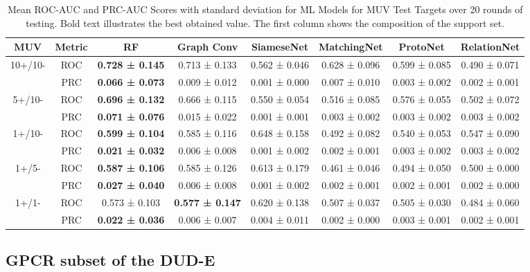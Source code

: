 \documentclass[journal=acscii,manuscript=article]{achemso}
\begin{document}
\begin{table}
\caption{Mean ROC-AUC and PRC-AUC Scores with standard deviation for ML Models for MUV Test Targets over 20 rounds of testing. Bold text illustrates the best obtained value. The first column shows the composition of the support set.}
\centering
\begin{tabular}{@{}cccccccc@{}}
\hline
\textbf{MUV} & \textbf{Metric} & \textbf{RF} & \textbf{Graph Conv} & \textbf{SiameseNet} & \textbf{MatchingNet} & \textbf{ProtoNet} & \textbf{RelationNet} \\
\hline
10+/10- & ROC & \textbf{0.728 ± 0.145} & 0.713 ± 0.133 & 0.562 ± 0.046 & 0.628 ± 0.096 & 0.599 ± 0.085 & 0.490 ± 0.071 \\ & PRC & \textbf{0.066 ± 0.073} & 0.009 ± 0.012 & 0.001 ± 0.000 & 0.007 ± 0.010 & 0.003 ± 0.002 & 0.002 ± 0.001\\
\hline
5+/10- & ROC & \textbf{0.696 ± 0.132} & 0.666 ± 0.115 & 0.550 ± 0.054 & 0.516 ± 0.085 & 0.576 ± 0.055 & 0.502 ± 0.072 \\ & PRC & \textbf{0.071 ± 0.076} & 0.015 ± 0.022 & 0.001 ± 0.001 & 0.003 ± 0.002 & 0.003 ± 0.002 & 0.003 ± 0.002\\
\hline
1+/10- & ROC & \textbf{0.599 ± 0.104} & 0.585 ± 0.116 & 0.648 ± 0.158 & 0.492 ± 0.082 & 0.540 ± 0.053 & 0.547 ± 0.090 \\ & PRC & \textbf{0.021 ± 0.032} & 0.006 ± 0.008 & 0.001 ± 0.002 & 0.002 ± 0.001 & 0.003 ± 0.002 & 0.003 ± 0.002\\
\hline
1+/5- & ROC & \textbf{0.587 ± 0.106} & 0.585 ± 0.126 & 0.613 ± 0.179 & 0.461 ± 0.046 & 0.494 ± 0.050 & 0.500 ± 0.000 \\ & PRC & \textbf{0.027 ± 0.040} & 0.006 ± 0.008 & 0.001 ± 0.002 & 0.002 ± 0.001 & 0.002 ± 0.001 & 0.002 ± 0.000\\
\hline
1+/1- & ROC & 0.573 ± 0.103 & \textbf{0.577 ± 0.147} & 0.620 ± 0.138 & 0.507 ± 0.037 & 0.505 ± 0.030 & 0.484 ± 0.060 \\ & PRC & \textbf{0.022 ± 0.036} & 0.006 ± 0.007 & 0.004 ± 0.011 & 0.002 ± 0.000 & 0.003 ± 0.001 & 0.002 ± 0.001\\
\hline
\end{tabular}
\label{table:muv-mean}
\end{table}

\subsection{GPCR subset of the DUD-E}
\end{document}
